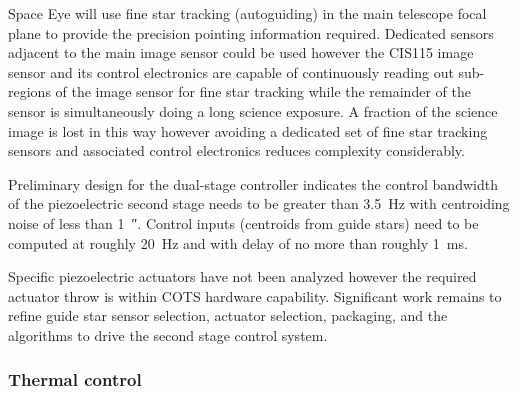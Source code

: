 \documentclass[]{iac}
\begin{document}
Space Eye will use fine star tracking (autoguiding) in the main telescope focal plane to provide the precision pointing
information required. Dedicated sensors adjacent to the main image sensor could be used however the CIS115 image sensor
and its control electronics are capable of continuously reading out sub-regions of the image sensor for fine star
tracking while the remainder of the sensor is simultaneously doing a long science exposure. A fraction of the science
image is lost in this way however avoiding a dedicated set of fine star tracking sensors and associated control
electronics reduces complexity considerably.

Preliminary design for the dual-stage controller indicates the control bandwidth of the piezoelectric second stage needs
to be greater than \SI{3.5}{\hertz} with centroiding noise of less than \SI{1}{\arcsecond}. Control inputs (centroids
from guide stars) need to be computed at roughly \SI{20}{\hertz} and with delay of no more than roughly
\SI{1}{\milli\second}.

Specific piezoelectric actuators have not been analyzed however the required actuator throw is within COTS hardware
capability. Significant work remains to refine guide star sensor selection, actuator selection, packaging, and the
algorithms to drive the second stage control system.

\subsubsection{Thermal control}
\label{sec:thermal}
\end{document}
